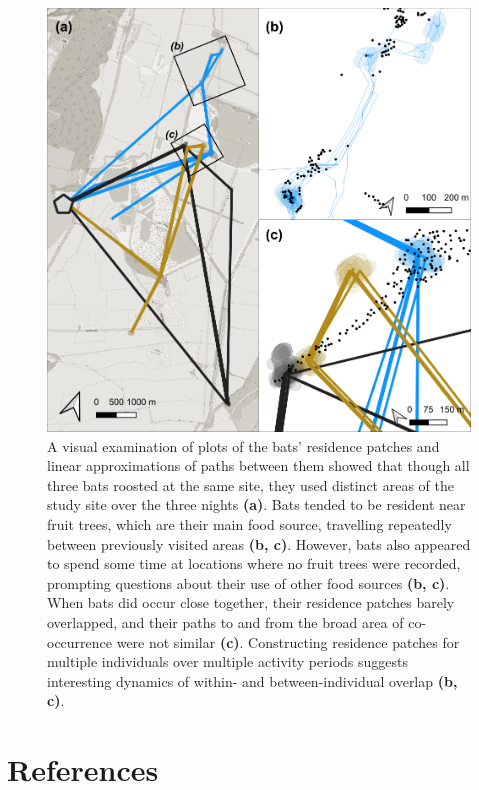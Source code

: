 \documentclass[
]{scrartcl}
\begin{document}
\begin{figure}
\centering
\includegraphics{figures/fig_08_bats.png}
\caption{A visual examination of plots of the bats' residence patches and linear approximations of paths between them showed that though all three bats roosted at the same site, they used distinct areas of the study site over the three nights \textbf{(a)}.
Bats tended to be resident near fruit trees, which are their main food source, travelling repeatedly between previously visited areas \textbf{(b, c)}.
However, bats also appeared to spend some time at locations where no fruit trees were recorded, prompting questions about their use of other food sources \textbf{(b, c)}.
When bats did occur close together, their residence patches barely overlapped, and their paths to and from the broad area of co-occurrence were not similar \textbf{(c)}.
Constructing residence patches for multiple individuals over multiple activity periods suggests interesting dynamics of within- and between-individual overlap \textbf{(b, c)}.}
\end{figure}

\hypertarget{references}{%
\section{References}\label{references}}
\end{document}
